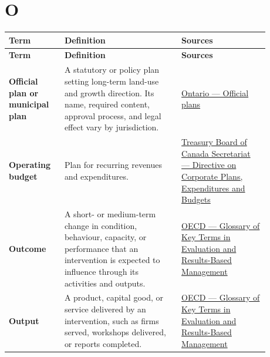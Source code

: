 \documentclass[11pt,letterpaper,oneside,openany]{book}
\begin{document}
\section[O]{O}
\begin{center}
\small
\setlength{\LTpre}{0.4em}
\setlength{\LTpost}{0.8em}
\begin{longtable}{>{\RaggedRight\arraybackslash}p{0.180\linewidth}>{\RaggedRight\arraybackslash}p{0.400\linewidth}>{\RaggedRight\arraybackslash}p{0.300\linewidth}}
\rowcolor{DeepNavy}
\color{white}\bfseries Term & \color{white}\bfseries Definition & \color{white}\bfseries Sources \\
\endfirsthead
\rowcolor{DeepNavy}
\color{white}\bfseries Term & \color{white}\bfseries Definition & \color{white}\bfseries Sources \\
\endhead
\textbf{Official plan or municipal plan} & A statutory or policy plan setting long-term land-use and growth direction. Its name, required content, approval process, and legal effect vary by jurisdiction. & \href{https://www.ontario.ca/document/citizens-guide-land-use-planning/official-plans}{Ontario --- Official plans} \\
\textbf{Operating budget} & Plan for recurring revenues and expenditures. & \href{https://www.tbs-sct.canada.ca/pol/doc-eng.aspx?id=32574}{Treasury Board of Canada Secretariat --- Directive on Corporate Plans, Expenditures and Budgets} \\
\textbf{Outcome} & A short- or medium-term change in condition, behaviour, capacity, or performance that an intervention is expected to influence through its activities and outputs. & \href{https://www.oecd.org/en/publications/glossary-of-key-terms-in-evaluation-and-results-based-management-for-sustainable-development-second-edition\_632da462-en-fr-es.html}{OECD --- Glossary of Key Terms in Evaluation and Results-Based Management} \\
\textbf{Output} & A product, capital good, or service delivered by an intervention, such as firms served, workshops delivered, or reports completed. & \href{https://www.oecd.org/en/publications/glossary-of-key-terms-in-evaluation-and-results-based-management-for-sustainable-development-second-edition\_632da462-en-fr-es.html}{OECD --- Glossary of Key Terms in Evaluation and Results-Based Management} \\
\end{longtable}
\end{center}
\end{document}
